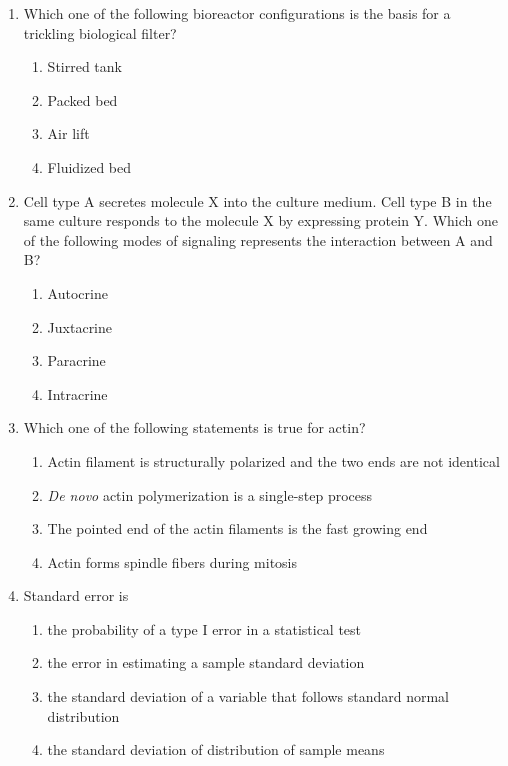 \documentclass[journal,12pt,onecolumn]{IEEEtran}
\theoremstyle{remark}
\begin{document}
\begin{enumerate}
    \item Which one of the following bioreactor configurations is the basis for a trickling biological filter?
    \begin{multicols}{2}
    \begin{enumerate}
        \item Stirred tank
        \item Packed bed
        \item Air lift
        \item Fluidized bed
    \end{enumerate}
    \end{multicols}
\item Cell type A secretes molecule X into the culture medium. Cell type B in the same culture responds to the molecule X by expressing protein Y. Which one of the following modes of signaling represents the interaction between A and B?
    \begin{multicols}{2}
    \begin{enumerate}
        \item Autocrine
        \item Juxtacrine
        \item Paracrine
        \item Intracrine
    \end{enumerate}
    \end{multicols}

    \item Which one of the following statements is true for actin?
    
    \begin{enumerate}
        \item Actin filament is structurally polarized and the two ends are not identical
        \item \textit{De novo} actin polymerization is a single-step process
        \item The pointed end of the actin filaments is the fast growing end
        \item Actin forms spindle fibers during mitosis
    \end{enumerate}
    

    \item Standard error is
    
    \begin{enumerate}
        \item the probability of a type I error in a statistical test
        \item the error in estimating a sample standard deviation
        \item the standard deviation of a variable that follows standard normal distribution
        \item the standard deviation of distribution of sample means
    \end{enumerate}
    

\end{enumerate}
\end{document}
